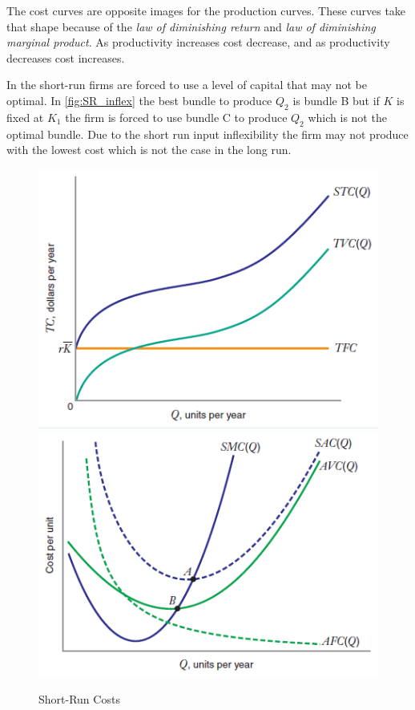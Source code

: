 \documentclass[../ECON-281-Notes.tex]{subfiles}
\begin{document}
The cost curves are opposite images for the production curves. These curves take that shape because of the \emph{law of diminishing return} and \emph{law of diminishing marginal product}. As productivity increases cost decrease, and as productivity decreases cost increases. 

In the short-run firms are forced to use a level of capital that may not be optimal. In \cref{fig:SR_inflex} the best bundle to produce \(Q_2\) is bundle B but if \(K\) is fixed at \(K_1\) the firm is forced to use bundle C to produce \(Q_2\) which is not the optimal bundle. Due to the short run input inflexibility the firm may not produce with the lowest cost which is not the case in the long run. 
\begin{figure}[!h]
    \centering
    \includegraphics[width=\columnwidth]{../assets/SRTC.png}   
    \includegraphics[width=\columnwidth]{../assets/SRMAC.png}   
    \caption{Short-Run Costs}
    \label{fig:SR_costs}
\end{figure}
\end{document}

